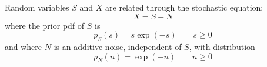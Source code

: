 \begin{solution}
\end{solution}

\else

\question Random variables $S$ and $X$ are related through the stochastic equation:
$$X=S+N$$
where the prior pdf of $S$ is
$$p_S(s)=s\exp(-s) \qquad s \ge 0$$
and where $N$ is an additive noise, independent of $S$, with distribution
$$p_N(n)=\exp(-n) \qquad n\ge 0$$


